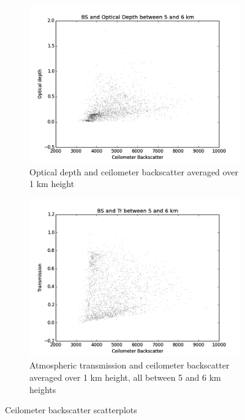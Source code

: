 \documentclass[a4paper,titlepage, twoside]{report}
\begin{document}
\begin{figure}
\begin{subfigure}{0.48\textwidth}
\includegraphics[width=\textwidth]{BS5_tau.png}
\caption{Optical depth and ceilometer backscatter averaged over 1 km height}
\end{subfigure}
\hfill
\begin{subfigure}{0.48\textwidth}
\includegraphics[width=\textwidth]{BS5_Tr.png}
\caption{Atmospheric transmission and ceilometer backscatter averaged over 1 km height, all  between 5 and 6 km heights}
\end{subfigure}
\caption{Ceilometer backscatter scatterplots}
\label{fig:data-13}
\end{figure}
\end{document}
